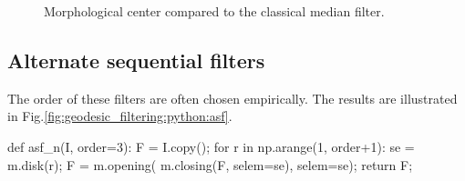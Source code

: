 \begin{figure}[H]
 \centering\caption{Morphological center compared to the classical median filter.}
 \hfill
 \hfill
 \label{fig:geodesic_filtering:python:center}%
\end{figure}


\subsection{Alternate sequential filters}
The order of these filters are often chosen empirically. The results are illustrated in Fig.\ref{fig:geodesic_filtering:python:asf}.

\begin{python}
def asf_n(I, order=3):
    F = I.copy();
    for r in np.arange(1, order+1):
        se = m.disk(r);
        F = m.opening( m.closing(F, selem=se), selem=se);
    return F;
\end{python}

